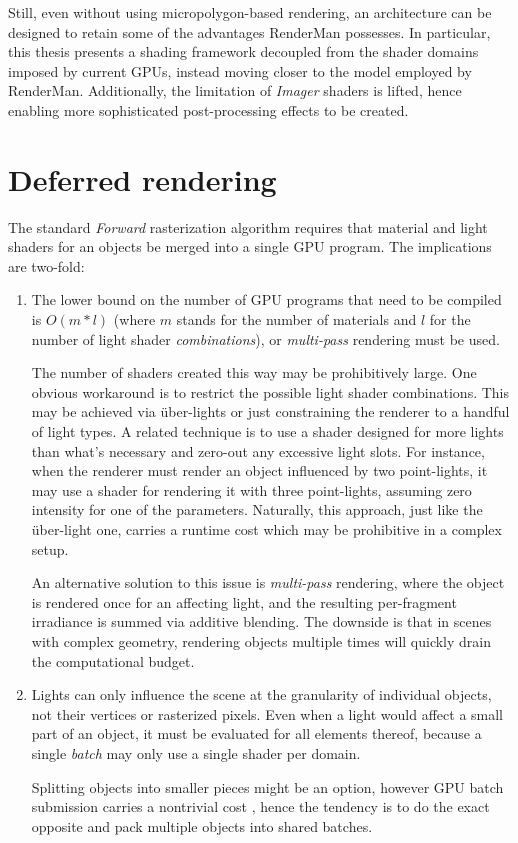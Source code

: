 Still, even without using micropolygon-based rendering, an architecture can be designed to retain some of the advantages RenderMan possesses. In particular, this thesis presents a shading framework decoupled from the shader domains imposed by current GPUs, instead moving closer to the model employed by RenderMan. Additionally, the limitation of \emph{Imager} shaders is lifted, hence enabling more sophisticated post-processing effects to be created.


\section{Deferred rendering}

The standard \emph{Forward} rasterization algorithm requires that material and light shaders for an objects be merged into a single GPU program. The implications are two-fold:
\begin{enumerate}
\item The lower bound on the number of GPU programs that need to be compiled is $O(m * l)$ (where $m$ stands for the number of materials and $l$ for the number of light shader \emph{combinations}), or \emph{multi-pass} rendering must be used.

The number of shaders created this way may be prohibitively large. One obvious workaround is to restrict the possible light shader combinations. This may be achieved via über-lights \cite{UberLights, UberLightsCg} or just constraining the renderer to a handful of light types. A related technique is to use a shader designed for more lights than what's necessary and zero-out any excessive light slots. For instance, when the renderer must render an object influenced by two point-lights, it may use a shader for rendering it with three point-lights, assuming zero intensity for one of the parameters. Naturally, this approach, just like the über-light one, carries a runtime cost which may be prohibitive in a complex setup.

An alternative solution to this issue is \emph{multi-pass} rendering, where the object is rendered once for an affecting light, and the resulting per-fragment irradiance is summed via additive blending. The downside is that in scenes with complex geometry, rendering objects multiple times will quickly drain the computational budget.

\item Lights can only influence the scene at the granularity of individual objects, not their vertices or rasterized pixels. Even when a light would affect a small part of an object, it must be evaluated for all elements thereof, because a single \emph{batch} may only use a single shader per domain.

Splitting objects into smaller pieces might be an option, however GPU batch submission carries a nontrivial cost \cite{BatchBatchBatch}, hence the tendency is to do the exact opposite and pack multiple objects into shared batches.
\end{enumerate}

